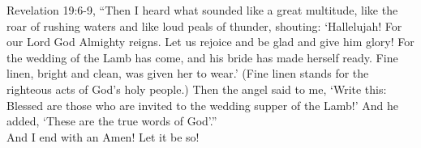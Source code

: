 \documentclass[oneside]{book}
\begin{document}
Revelation 19:6-9, “Then I heard what sounded like a great multitude, like the roar of rushing waters and like loud peals of thunder, shouting: ‘Hallelujah! For our Lord God Almighty reigns. Let us rejoice and be glad and give him glory! For the wedding of the Lamb has come, and his bride has made herself ready. Fine linen, bright and clean, was given her to wear.’ (Fine linen stands for the righteous acts of God’s holy people.) Then the angel said to me, ‘Write this: Blessed are those who are invited to the wedding supper of the Lamb!’ And he added, ‘These are the true words of God’.”\\

And I end with an Amen! Let it be so!


\backmatter
\chapter*{}
\begin{minipage}{\linewidth}
\end{minipage}\\
\clearpage
\end{document}
